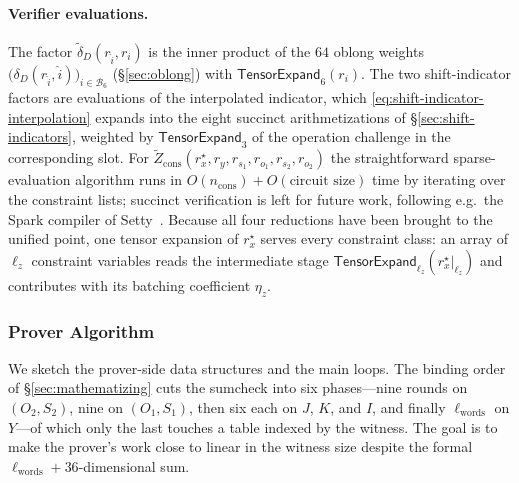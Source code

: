 \documentclass{article}
\theoremstyle{definition}
\newcommand*{\mle}{\widetilde}
\newcommand{\BB}{\mathcal{B}}
\begin{document}
\paragraph{Verifier evaluations.}
The factor $\mle{\delta}_D(r_{\widehat{i}}, r_i)$ is the inner product of the $64$ oblong weights $\bigl( \delta_D(r_{\widehat{i}}, \widehat{i}) \bigr)_{i \in \BB_6}$ (\S\ref{sec:oblong}) with $\textsf{TensorExpand}_6(r_i)$. The two shift-indicator factors are evaluations of the interpolated indicator, which \eqref{eq:shift-indicator-interpolation} expands into the eight succinct arithmetizations of \S\ref{sec:shift-indicators}, weighted by $\textsf{TensorExpand}_3$ of the operation challenge in the corresponding slot. For $\mle{Z}_\text{cons}(r^\star_x, r_y, r_{s_1}, r_{o_1}, r_{s_2}, r_{o_2})$ the straightforward sparse-evaluation algorithm runs in $O(n_\text{cons}) + O(\text{circuit size})$ time by iterating over the constraint lists; succinct verification is left for future work, following e.g.\ the Spark compiler of Setty~\cite{Setty:2020aa}. Because all four reductions have been brought to the unified point, one tensor expansion of $r^\star_x$ serves every constraint class: an array of $\ell_z$ constraint variables reads the intermediate stage $\textsf{TensorExpand}_{\ell_z}(r^\star_x|_{\ell_z})$ and contributes with its batching coefficient $\eta_z$.

\subsubsection{Prover Algorithm}
\label{sec:shift-reduction-prover}

We sketch the prover-side data structures and the main loops. The binding order of \S\ref{sec:mathematizing} cuts the sumcheck into six phases---nine rounds on $(O_2, S_2)$, nine on $(O_1, S_1)$, then six each on $J$, $K$, and $I$, and finally $\ell_\text{words}$ on $Y$---of which only the last touches a table indexed by the witness. The goal is to make the prover's work close to linear in the witness size despite the formal $\ell_\text{words} + 36$-dimensional sum.
\end{document}
